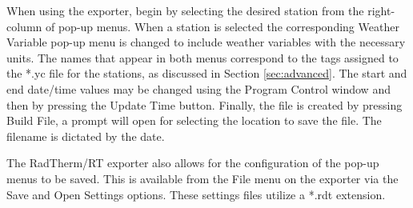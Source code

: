 When using the exporter, begin by selecting the desired station from the right-column of pop-up menus.  When a station is selected the corresponding Weather Variable pop-up menu is changed to include weather variables with the necessary units.  The names that appear in both menus correspond to the tags assigned to the *.yc file for the stations, as discussed in Section \ref{sec:advanced}.  The start and end date/time values may be changed using the Program Control window and then by pressing the Update Time button.  Finally, the file is created by pressing Build File, a prompt will open for selecting the location to save the file.  The filename is dictated by the date.

The RadTherm/RT exporter also allows for the configuration of the pop-up menus to be saved.  This is available from the File menu on the exporter via the Save and Open Settings options.  These settings files utilize a *.rdt extension.
